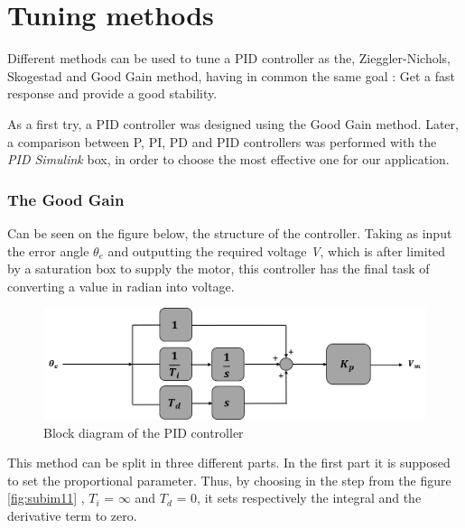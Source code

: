 \section{Tuning methods}
Different methods can be used to tune a PID controller as the, Zieggler-Nichols, Skogestad and Good Gain method, having in common the same goal : Get a fast response and provide a good stability.\par
As a first try, a PID controller was designed using the Good Gain method. Later, a comparison between P, PI, PD and PID controllers was performed with the \emph{PID Simulink} box, in order to choose the most effective one for our application.\par 	

\subsubsection{The Good Gain}


Can be seen on the figure below, the structure of the controller. Taking as input the error angle \textbf{$\theta_{e}$} and outputting the required voltage \textit{V}, which is after limited by a saturation box to supply the motor, this controller has the final task of converting a value in radian into voltage.\par

\begin{figure}[H]
  \centering
  \includegraphics[scale=0.5]{figures/controller_model.png}
  \caption[LABEL] {Block diagram of the PID controller}
\end{figure}
  
This method can be split in three different parts. In the first part it is supposed to set the proportional parameter. Thus, by choosing in the step from the figure \ref{fig:subim11} , $T_i$ = $\infty$ and $T_d$ = 0, it sets respectively the integral and the derivative term to zero.

